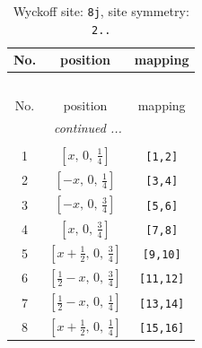 \documentclass[fleqn,8pt]{jsarticle}
\begin{document}
\begin{longtable}{ccc}
\caption{Wyckoff site: {\tt 8j}, site symmetry: {\tt 2..}}
 \\
 \hline \hline
No. & position & mapping \\ \hline \endfirsthead

\multicolumn{2}{l}{\tablename\ \thetable{}} \\
 \hline \hline
No. & position & mapping \\ \hline \endhead

 \hline \hline
\multicolumn{2}{r}{\footnotesize\it continued ...} \\ \endfoot

 \hline \hline
\multicolumn{2}{r}{} \\ \endlastfoot

1 & $\left[ x,\, 0,\, \frac{1}{4} \right]$ & {\tt [1,2]} \\ \hline
2 & $\left[ - x,\, 0,\, \frac{1}{4} \right]$ & {\tt [3,4]} \\ \hline
3 & $\left[ - x,\, 0,\, \frac{3}{4} \right]$ & {\tt [5,6]} \\ \hline
4 & $\left[ x,\, 0,\, \frac{3}{4} \right]$ & {\tt [7,8]} \\ \hline
5 & $\left[ x + \frac{1}{2},\, 0,\, \frac{3}{4} \right]$ & {\tt [9,10]} \\ \hline
6 & $\left[ \frac{1}{2} - x,\, 0,\, \frac{3}{4} \right]$ & {\tt [11,12]} \\ \hline
7 & $\left[ \frac{1}{2} - x,\, 0,\, \frac{1}{4} \right]$ & {\tt [13,14]} \\ \hline
8 & $\left[ x + \frac{1}{2},\, 0,\, \frac{1}{4} \right]$ & {\tt [15,16]} \\
\end{longtable}
\renewcommand{\arraystretch}{1.2}
\end{document}
